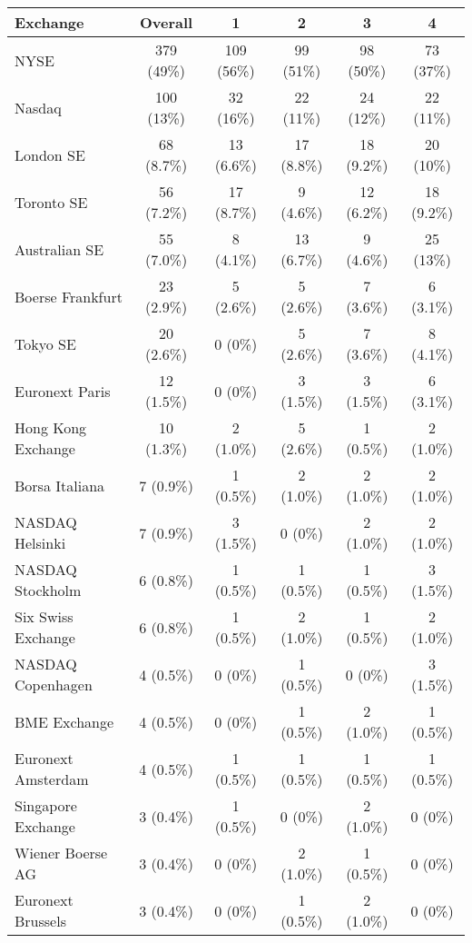 \documentclass[12pt]{article}
\begin{document}
\begin{table}
    \centering
    \label{tab:exchngs}
    
    \begin{tabular}{lccccc}
    \toprule
    Exchange & Overall & 1  & 2 & 3 & 4 \\
    \midrule
    NYSE & 379 (49\%) & 109 (56\%) & 99 (51\%) & 98 (50\%) & 73 (37\%)\\
    Nasdaq & 100 (13\%) & 32 (16\%) & 22 (11\%) & 24 (12\%) & 22 (11\%)\\
    London SE & 68 (8.7\%) & 13 (6.6\%) & 17 (8.8\%) & 18 (9.2\%) & 20 (10\%)\\
    Toronto SE & 56 (7.2\%) & 17 (8.7\%) & 9 (4.6\%) & 12 (6.2\%) & 18 (9.2\%)\\
    Australian SE & 55 (7.0\%) & 8 (4.1\%) & 13 (6.7\%) & 9 (4.6\%) & 25 (13\%)\\
    Boerse Frankfurt & 23 (2.9\%) & 5 (2.6\%) & 5 (2.6\%) & 7 (3.6\%) & 6 (3.1\%)\\
    Tokyo SE & 20 (2.6\%) & 0 (0\%) & 5 (2.6\%) & 7 (3.6\%) & 8 (4.1\%)\\
    Euronext Paris & 12 (1.5\%) & 0 (0\%) & 3 (1.5\%) & 3 (1.5\%) & 6 (3.1\%)\\
    Hong Kong Exchange & 10 (1.3\%) & 2 (1.0\%) & 5 (2.6\%) & 1 (0.5\%) & 2 (1.0\%)\\
    Borsa Italiana & 7 (0.9\%) & 1 (0.5\%) & 2 (1.0\%) & 2 (1.0\%) & 2 (1.0\%)\\
    NASDAQ Helsinki & 7 (0.9\%) & 3 (1.5\%) & 0 (0\%) & 2 (1.0\%) & 2 (1.0\%)\\
    NASDAQ Stockholm & 6 (0.8\%) & 1 (0.5\%) & 1 (0.5\%) & 1 (0.5\%) & 3 (1.5\%)\\
    Six Swiss Exchange & 6 (0.8\%) & 1 (0.5\%) & 2 (1.0\%) & 1 (0.5\%) & 2 (1.0\%)\\
    NASDAQ Copenhagen & 4 (0.5\%) & 0 (0\%) & 1 (0.5\%) & 0 (0\%) & 3 (1.5\%)\\
    BME Exchange & 4 (0.5\%) & 0 (0\%) & 1 (0.5\%) & 2 (1.0\%) & 1 (0.5\%)\\
    Euronext Amsterdam & 4 (0.5\%) & 1 (0.5\%) & 1 (0.5\%) & 1 (0.5\%) & 1 (0.5\%)\\
    Singapore Exchange & 3 (0.4\%) & 1 (0.5\%) & 0 (0\%) & 2 (1.0\%) & 0 (0\%)\\
    Wiener Boerse AG & 3 (0.4\%) & 0 (0\%) & 2 (1.0\%) & 1 (0.5\%) & 0 (0\%)\\
    Euronext Brussels & 3 (0.4\%) & 0 (0\%) & 1 (0.5\%) & 2 (1.0\%) & 0 (0\%)\\

\end{tabular}
\end{table}
\end{document}

